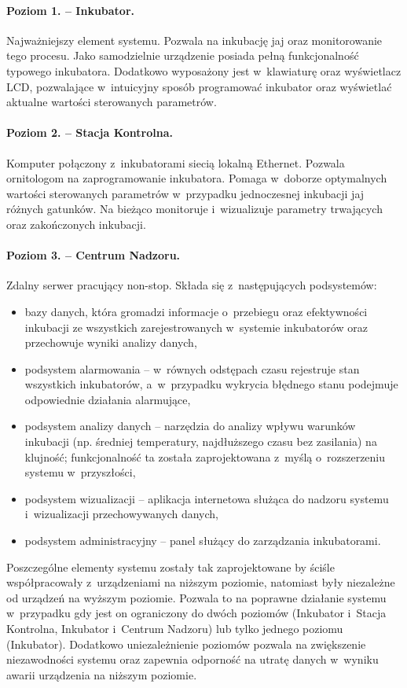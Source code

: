 \paragraph{Poziom 1. -- Inkubator.}
Najważniejszy element systemu. Pozwala na inkubację jaj oraz monitorowanie
tego procesu. Jako samodzielnie urządzenie posiada pełną funkcjonalność typowego
inkubatora. Dodatkowo wyposażony jest w~klawiaturę oraz wyświetlacz LCD,
pozwalające w~intuicyjny sposób programować inkubator oraz wyświetlać aktualne
wartości sterowanych parametrów.

\paragraph{Poziom 2. -- Stacja Kontrolna.}
Komputer połączony z~inkubatorami siecią lokalną Ethernet. Pozwala ornitologom
na zaprogramowanie inkubatora. Pomaga w~doborze optymalnych wartości sterowanych
parametrów w~przypadku jednoczesnej inkubacji jaj różnych gatunków. Na bieżąco
monitoruje i~wizualizuje parametry trwających oraz zakończonych inkubacji.

\paragraph{Poziom 3. -- Centrum Nadzoru.}
Zdalny serwer pracujący non-stop. Składa się z~następujących podsystemów:
\begin{itemize}
	\item bazy danych, która gromadzi informacje o~przebiegu oraz efektywności
		inkubacji ze wszystkich zarejestrowanych w~systemie inkubatorów oraz
		przechowuje wyniki analizy danych,
	\item podsystem alarmowania -- w~równych odstępach czasu rejestruje stan
		wszystkich inkubatorów, a~w~przypadku wykrycia błędnego stanu podejmuje
		odpowiednie działania alarmujące,
	\item podsystem analizy danych -- narzędzia do analizy wpływu warunków
		inkubacji (np. średniej temperatury, najdłuższego czasu bez zasilania) na
		klujność; funkcjonalność ta została zaprojektowana z~myślą o~rozszerzeniu systemu w~przyszłości,
	\item podsystem wizualizacji -- aplikacja internetowa służąca do nadzoru
		systemu i~wizualizacji przechowywanych danych,
	\item podsystem administracyjny -- panel służący do zarządzania inkubatorami.
\end{itemize}

Poszczególne elementy systemu zostały tak zaprojektowane by ściśle
współpracowały z~urządzeniami na niższym poziomie, natomiast były niezależne od
urządzeń na wyższym poziomie. Pozwala to na poprawne działanie systemu
w~przypadku gdy jest on ograniczony do dwóch poziomów (Inkubator i~Stacja
Kontrolna, Inkubator i~Centrum Nadzoru) lub tylko jednego poziomu (Inkubator).
Dodatkowo uniezależnienie poziomów pozwala na zwiększenie niezawodności
systemu oraz zapewnia odporność na utratę danych w~wyniku awarii urządzenia na
niższym poziomie.

